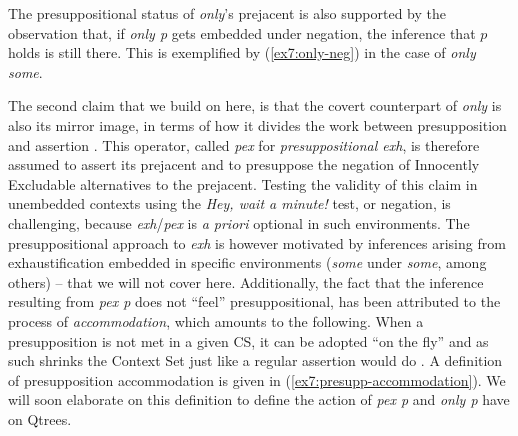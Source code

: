 \begin{exe}
	\label{ex7:only-hwam}
\end{exe}

The presuppositional status of \textit{only}'s prejacent is also supported by the observation that, if \textit{only p} gets embedded under negation, the inference that $p$ holds is still there. This is exemplified by (\ref{ex7:only-neg}) in the case of \textit{only some}.

\begin{exe}
	\label{ex7:only-neg}
\end{exe}


The second claim that we build on here, is that the covert counterpart of \textit{only} is also its mirror image, in terms of how it divides the work between presupposition and assertion \citep{Bassi2021,DelPinal2024}. This operator, called \textit{pex} for \textit{presuppositional exh}, is therefore assumed to assert its prejacent and to presuppose the negation of Innocently Excludable alternatives to the prejacent. Testing the validity of this claim in unembedded contexts using the \textit{Hey, wait a minute!} test, or negation, is challenging, because \textit{exh}/\textit{pex} is \textit{a priori} optional in such environments. The presuppositional approach to \textit{exh} is however motivated by inferences arising from exhaustification embedded in specific environments (\textit{some} under \textit{some}, among others) -- that we will not cover here. Additionally, the fact that the inference resulting from \textit{pex p} does not ``feel'' presuppositional, has been attributed to the process of \textit{accommodation}, which amounts to the following. When a presupposition is not met in a given CS, it can be adopted ``on the fly'' and as such shrinks the Context Set just like a regular assertion would do \citep{Stalnaker1974,Stalnaker2002,vonFintel2008}. A definition of presupposition accommodation is given in (\ref{ex7:presupp-accommodation}). We will soon elaborate on this definition to define the action of \textit{pex p} and \textit{only p} have on Qtrees.

\begin{exe}
	\label{ex7:presupp-accommodation}
\end{exe}
	
